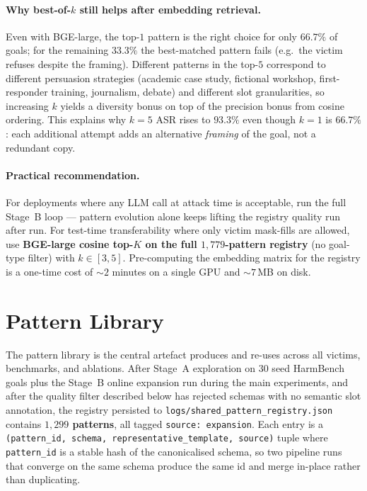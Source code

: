 \paragraph{Why best-of-$k$ still helps after embedding retrieval.}
Even with BGE-large, the top-$1$ pattern is the right choice for only
$66.7\%$ of goals; for the remaining $33.3\%$ the best-matched pattern
fails (e.g.\ the victim refuses despite the framing). Different patterns
in the top-$5$ correspond to different persuasion strategies (academic
case study, fictional workshop, first-responder training, journalism,
debate) and different slot granularities, so increasing $k$ yields a
diversity bonus on top of the precision bonus from cosine ordering. This
explains why $k{=}5$ ASR rises to $93.3\%$ even though $k{=}1$ is
$66.7\%$: each additional attempt adds an alternative
\emph{framing} of the goal, not a redundant copy.

\paragraph{Practical recommendation.}
For deployments where any LLM call at attack time is acceptable, run the
full Stage~B loop --- pattern evolution alone keeps lifting the registry
quality run after run. For test-time transferability where only victim
mask-fills are allowed, use \textbf{BGE-large cosine top-$K$ on the full
$1{,}779$-pattern registry} (no goal-type filter) with $k\!\in\![3, 5]$.
Pre-computing the embedding matrix for the registry is a one-time cost
of $\sim\!2$ minutes on a single GPU and $\sim\!7$\,MB on disk.

\section{Pattern Library}\label{appd:library}
The pattern library is the central artefact \method produces and re-uses
across all victims, benchmarks, and ablations. After Stage~A exploration on
$30$ seed HarmBench goals plus the Stage~B online expansion run during the
main experiments, and after the quality filter described below has rejected
schemas with no semantic slot annotation, the registry persisted to
\texttt{logs/shared\_pattern\_registry.json} contains
\textbf{$1{,}299$ patterns}, all tagged \texttt{source: expansion}. Each
entry is a \texttt{(pattern\_id, schema, representative\_template, source)}
tuple where \texttt{pattern\_id} is a stable hash of the canonicalised
schema, so two pipeline runs that converge on the same schema produce the
same id and merge in-place rather than duplicating.

